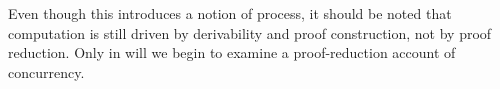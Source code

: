 





Even though this  introduces a notion of process, it should be noted that computation is still driven by derivability and proof construction, not by proof reduction.
Only in  will we begin to examine a proof-reduction account of concurrency.


